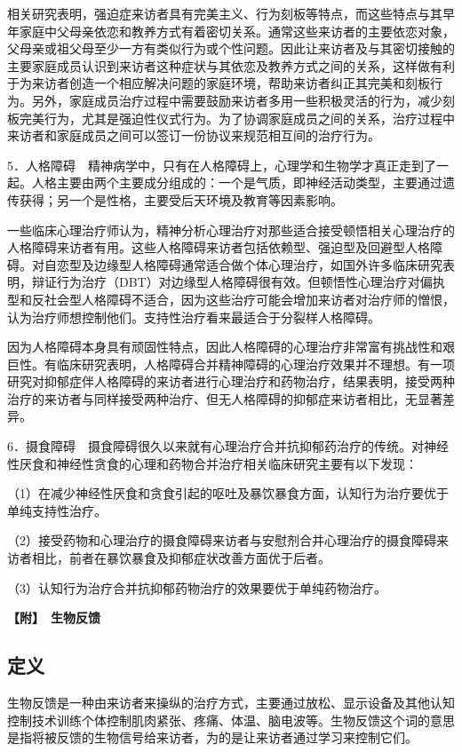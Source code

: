 相关研究表明，强迫症来访者具有完美主义、行为刻板等特点，而这些特点与其早年家庭中父母亲依恋和教养方式有着密切关系。通常这些来访者的主要依恋对象，父母亲或祖父母至少一方有类似行为或个性问题。因此让来访者及与其密切接触的主要家庭成员认识到来访者这种症状与其依恋及教养方式之间的关系，这样做有利于为来访者创造一个相应解决问题的家庭环境，帮助来访者纠正其完美和刻板行为。另外，家庭成员治疗过程中需要鼓励来访者多用一些积极灵活的行为，减少刻板完美行为，尤其是强迫性仪式行为。为了协调家庭成员之间的关系，治疗过程中来访者和家庭成员之间可以签订一份协议来规范相互间的治疗行为。

5．人格障碍　精神病学中，只有在人格障碍上，心理学和生物学才真正走到了一起。人格主要由两个主要成分组成的：一个是气质，即神经活动类型，主要通过遗传获得；另一个是性格，主要受后天环境及教育等因素影响。

一些临床心理治疗师认为，精神分析心理治疗对那些适合接受顿悟相关心理治疗的人格障碍来访者有用。这些人格障碍来访者包括依赖型、强迫型及回避型人格障碍。对自恋型及边缘型人格障碍通常适合做个体心理治疗，如国外许多临床研究表明，辩证行为治疗（DBT）对边缘型人格障碍很有效。但顿悟性心理治疗对偏执型和反社会型人格障碍不适合，因为这些治疗可能会增加来访者对治疗师的憎恨，认为治疗师想控制他们。支持性治疗看来最适合于分裂样人格障碍。

因为人格障碍本身具有顽固性特点，因此人格障碍的心理治疗非常富有挑战性和艰巨性。有临床研究表明，人格障碍合并精神障碍的心理治疗效果并不理想。有一项研究对抑郁症伴人格障碍的来访者进行心理治疗和药物治疗，结果表明，接受两种治疗的来访者与同样接受两种治疗、但无人格障碍的抑郁症来访者相比，无显著差异。

6．摄食障碍　摄食障碍很久以来就有心理治疗合并抗抑郁药治疗的传统。对神经性厌食和神经性贪食的心理和药物合并治疗相关临床研究主要有以下发现：

（1）在减少神经性厌食和贪食引起的呕吐及暴饮暴食方面，认知行为治疗要优于单纯支持性治疗。

（2）接受药物和心理治疗的摄食障碍来访者与安慰剂合并心理治疗的摄食障碍来访者相比，前者在暴饮暴食及抑郁症状改善方面优于后者。

（3）认知行为治疗合并抗抑郁药物治疗的效果要优于单纯药物治疗。

\textbf{【附】　生物反馈}

\subsection{定义}

生物反馈是一种由来访者来操纵的治疗方式，主要通过放松、显示设备及其他认知控制技术训练个体控制肌肉紧张、疼痛、体温、脑电波等。生物反馈这个词的意思是指将被反馈的生物信号给来访者，为的是让来访者通过学习来控制它们。

